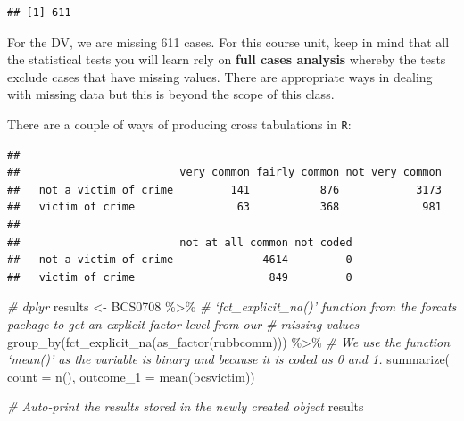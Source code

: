 \documentclass[
]{book}
\newenvironment{Shaded}{\begin{snugshade}}{\end{snugshade}}
\newcommand{\AttributeTok}[1]{\textcolor[rgb]{0.77,0.63,0.00}{#1}}
\newcommand{\CommentTok}[1]{\textcolor[rgb]{0.56,0.35,0.01}{\textit{#1}}}
\newcommand{\FunctionTok}[1]{\textcolor[rgb]{0.00,0.00,0.00}{#1}}
\newcommand{\NormalTok}[1]{#1}
\newcommand{\OtherTok}[1]{\textcolor[rgb]{0.56,0.35,0.01}{#1}}
\newcommand{\SpecialCharTok}[1]{\textcolor[rgb]{0.00,0.00,0.00}{#1}}
\begin{document}
\begin{Shaded}
\end{Shaded}

\begin{verbatim}
## [1] 611
\end{verbatim}

For the DV, we are missing 611 cases. For this course unit, keep in mind that all the statistical tests you will learn rely on \textbf{full cases analysis} whereby the tests exclude cases that have missing values. There are appropriate ways in dealing with missing data but this is beyond the scope of this class.

There are a couple of ways of producing cross tabulations in \texttt{R}:

\begin{Shaded}
\end{Shaded}

\begin{verbatim}
##                        
##                         very common fairly common not very common
##   not a victim of crime         141           876            3173
##   victim of crime                63           368             981
##                        
##                         not at all common not coded
##   not a victim of crime              4614         0
##   victim of crime                     849         0
\end{verbatim}

\begin{Shaded}
\begin{Highlighting}[]
\CommentTok{\# dplyr}
\NormalTok{results }\OtherTok{\textless{}{-}}\NormalTok{ BCS0708 }\SpecialCharTok{\%\textgreater{}\%} \CommentTok{\# ‘fct\_explicit\_na()’ function from the forcats package to get an explicit factor level from our \# missing values}
  \FunctionTok{group\_by}\NormalTok{(}\FunctionTok{fct\_explicit\_na}\NormalTok{(}\FunctionTok{as\_factor}\NormalTok{(rubbcomm))) }\SpecialCharTok{\%\textgreater{}\%} 
  \CommentTok{\# We use the function ‘mean()’ as the variable is binary and because it is coded as 0 and 1.}
  \FunctionTok{summarize}\NormalTok{( }\AttributeTok{count =} \FunctionTok{n}\NormalTok{(), }\AttributeTok{outcome\_1 =} \FunctionTok{mean}\NormalTok{(bcsvictim))}

\CommentTok{\# Auto{-}print the results stored in the newly created object }
\NormalTok{results}
\end{Highlighting}
\end{Shaded}
\end{document}
